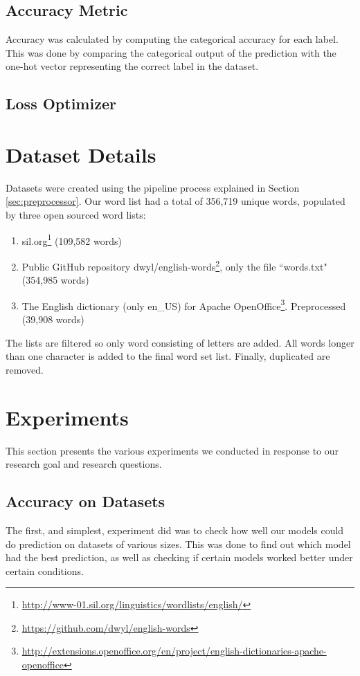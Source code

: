 \subsection{Accuracy Metric}
Accuracy was calculated by computing the categorical accuracy for each label. This was done by comparing the categorical output of the prediction with the one-hot vector representing the correct label in the dataset.

\subsection{Loss Optimizer}

\section{Dataset Details}
Datasets were created using the pipeline process explained in Section \ref{sec:preprocessor}. Our word list had a total of 356,719 unique words, populated by three open sourced word lists:

\begin{enumerate}
    \item sil.org\footnote{\url{http://www-01.sil.org/linguistics/wordlists/english/}} (109,582 words)
    \item Public GitHub repository dwyl/english-words\footnote{\url{https://github.com/dwyl/english-words}}, only the file ``words.txt" (354,985 words) 
    \item The English dictionary (only en\_US) for Apache OpenOffice\footnote{\url{http://extensions.openoffice.org/en/project/english-dictionaries-apache-openoffice}}. Preprocessed (39,908 words)
\end{enumerate}

The lists are filtered so only word consisting of letters are added. All words longer than one character is added to the final word set list. Finally, duplicated are removed.


\section{Experiments}
This section presents the various experiments we conducted in response to our research goal and research questions.

\subsection{Accuracy on Datasets}
\label{sec:accuracy_on_datasets}
The first, and simplest, experiment did was to check how well our models could do prediction on datasets of various sizes. This was done to find out which model had the best prediction, as well as checking if certain models worked better under certain conditions.

